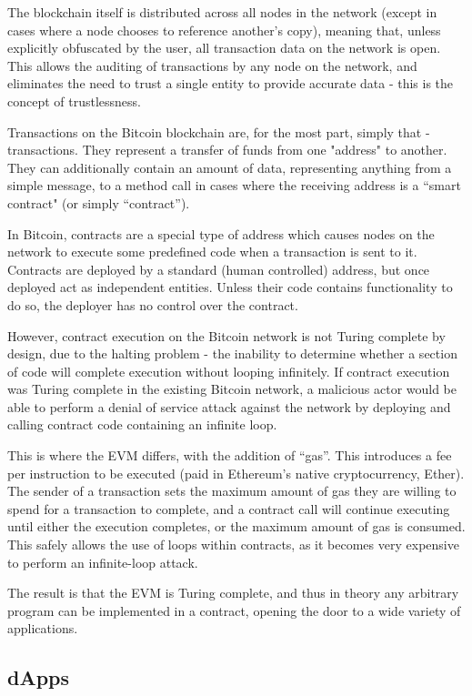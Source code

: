 The blockchain itself is distributed across all nodes in the network (except in cases where a node chooses to reference another’s copy), meaning that, unless explicitly obfuscated by the user, all transaction data on the network is open. This allows the auditing of transactions by any node on the network, and eliminates the need to trust a single entity to provide accurate data - this is the concept of trustlessness.

Transactions on the Bitcoin blockchain are, for the most part, simply that - transactions. They represent a transfer of funds from one "address" to another. They can additionally contain an amount of data, representing anything from a simple message, to a method call in cases where the receiving address is a “smart contract" (or simply “contract”).

In Bitcoin, contracts are a special type of address which causes nodes on the network to execute some predefined code when a transaction is sent to it. Contracts are deployed by a standard (human controlled) address, but once deployed act as independent entities. Unless their code contains functionality to do so, the deployer has no control over the contract.

However, contract execution on the Bitcoin network is not Turing complete by design, due to the halting problem - the inability to determine whether a section of code will complete execution without looping infinitely. If contract execution was Turing complete in the existing Bitcoin network, a malicious actor would be able to perform a denial of service attack against the network by deploying and calling contract code containing an infinite loop.

This is where the EVM differs, with the addition of “gas”. This introduces a fee per instruction to be executed (paid in Ethereum’s native cryptocurrency, Ether). The sender of a transaction sets the maximum amount of gas they are willing to spend for a transaction to complete, and a contract call will continue executing until either the execution completes, or the maximum amount of gas is consumed. This safely allows the use of loops within contracts, as it becomes very expensive to perform an infinite-loop attack.

The result is that the EVM is Turing complete, and thus in theory any arbitrary program can be implemented in a contract, opening the door to a wide variety of applications.

\subsection{dApps}


